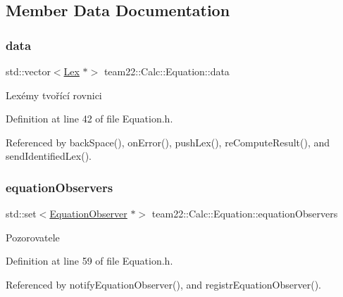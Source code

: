 \subsection{Member Data Documentation}
\mbox{\label{classteam22_1_1_calc_1_1_equation_ab02c12c6e452d5271f26bbae073ed4dc}} 
\subsubsection{\texorpdfstring{data}{data}}
{\footnotesize\ttfamily std\+::vector$<$\hyperlink{classteam22_1_1_calc_1_1_lex}{Lex} $\ast$$>$ team22\+::\+Calc\+::\+Equation\+::data\hspace{0.3cm}{\ttfamily [private]}}

Lexémy tvořící rovnici 

Definition at line 42 of file Equation.\+h.



Referenced by back\+Space(), on\+Error(), push\+Lex(), re\+Compute\+Result(), and send\+Identified\+Lex().

\mbox{\label{classteam22_1_1_calc_1_1_equation_a76439666b11701dd1c42507397c5a316}} 
\subsubsection{\texorpdfstring{equation\+Observers}{equationObservers}}
{\footnotesize\ttfamily std\+::set$<$\hyperlink{classteam22_1_1_calc_1_1_equation_observer}{Equation\+Observer} $\ast$$>$ team22\+::\+Calc\+::\+Equation\+::equation\+Observers\hspace{0.3cm}{\ttfamily [private]}}

Pozorovatele 

Definition at line 59 of file Equation.\+h.



Referenced by notify\+Equation\+Observer(), and registr\+Equation\+Observer().

\mbox{\label{classteam22_1_1_calc_1_1_equation_a8812a84e9c0f194eba491b0dba0cb015}} 

